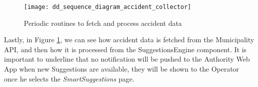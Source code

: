 \clearpage

\begin{figure}[ht]
    \centering
    \texttt{[image: dd\_sequence\_diagram\_accident\_collector]}
    \caption{Periodic routines to fetch and process accident data}
    \label{fig:dd_sequence_diagram_accident_collector}
\end{figure}

Lastly, in Figure \ref{fig:dd_sequence_diagram_accident_collector}, we can see
how accident data is fetched from the Municipality API, and then how it is
processed from the SuggestionsEngine component. It is important to underline
that no notification will be pushed to the Authority Web App when new
Suggestions are available, they will be shown to the Operator once he selects
the \emph{SmartSuggestions} page.

